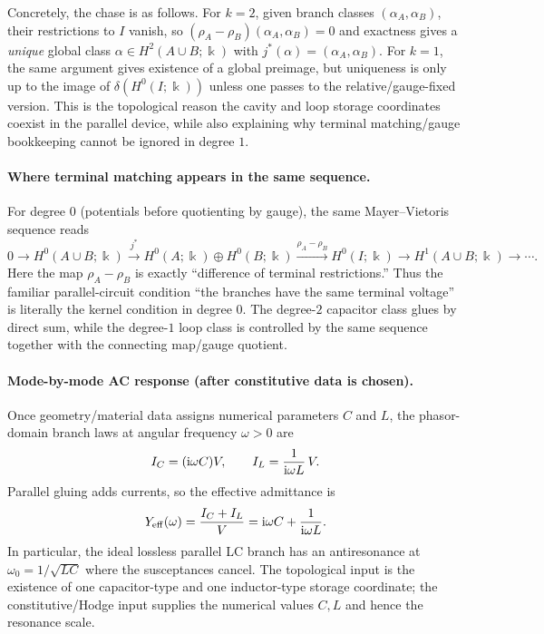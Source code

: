 \documentclass[11pt]{article}
\begin{document}
Concretely, the chase is as follows.
For $k=2$, given branch classes $(\alpha_A,\alpha_B)$, their restrictions to $I$ vanish, so $(\rho_A-\rho_B)(\alpha_A,\alpha_B)=0$ and exactness gives a \emph{unique} global class $\alpha\in H^2(A\cup B;\Bbbk)$ with $j^\ast(\alpha)=(\alpha_A,\alpha_B)$.
For $k=1$, the same argument gives existence of a global preimage, but uniqueness is only up to the image of $\delta(H^0(I;\Bbbk))$ unless one passes to the relative/gauge-fixed version.
This is the topological reason the cavity and loop storage coordinates coexist in the parallel device, while also explaining why terminal matching/gauge bookkeeping cannot be ignored in degree $1$.

\paragraph{Where terminal matching appears in the same sequence.}
For degree $0$ (potentials before quotienting by gauge), the same Mayer--Vietoris sequence reads
\[
0\longrightarrow H^0(A\cup B;\Bbbk)\xrightarrow{j^\ast} H^0(A;\Bbbk)\oplus H^0(B;\Bbbk)
\xrightarrow{\rho_A-\rho_B} H^0(I;\Bbbk)\longrightarrow H^1(A\cup B;\Bbbk)\longrightarrow \cdots.
\]
Here the map $\rho_A-\rho_B$ is exactly ``difference of terminal restrictions.''
Thus the familiar parallel-circuit condition ``the branches have the same terminal voltage'' is literally the kernel condition in degree $0$.
The degree-$2$ capacitor class glues by direct sum, while the degree-$1$ loop class is controlled by the same sequence together with the connecting map/gauge quotient.

\paragraph{Mode-by-mode AC response (after constitutive data is chosen).}
Once geometry/material data assigns numerical parameters $C$ and $L$, the phasor-domain branch laws at angular frequency $\omega>0$ are
\[
I_C=(\mathrm{i}\omega C)V,\qquad I_L=\frac{1}{\mathrm{i}\omega L}\,V.
\]
Parallel gluing adds currents, so the effective admittance is
\[
Y_{\mathrm{eff}}(\omega)=\frac{I_C+I_L}{V}
= \mathrm{i}\omega C+\frac{1}{\mathrm{i}\omega L}.
\]
In particular, the ideal lossless parallel LC branch has an antiresonance at $\omega_0=1/\sqrt{LC}$ where the susceptances cancel.
The topological input is the existence of one capacitor-type and one inductor-type storage coordinate; the constitutive/Hodge input supplies the numerical values $C,L$ and hence the resonance scale.
\end{document}
